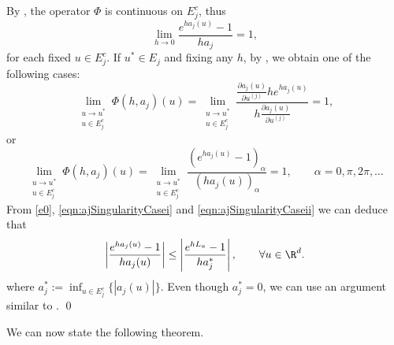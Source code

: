 \documentclass[sort&compress, preprint]{elsarticle}
\theoremstyle{definition}
\theoremstyle{plain}%
\theoremstyle{remark}
\begin{document}
\begin{pf}    By , the operator $\Phi$ is continuous
	on $E_j^c$, thus 
	\begin{equation}\label{e0}
		\lim_{h\to 0}
		\frac{e^{ha_j(u)}-1}{ha_j}=1,
	\end{equation}
	for each fixed $u\in E_j^c$. If $u^*\in E_j$ and fixing any $h$, by , 
	we obtain one of the following cases:
	\begin{equation}\label{eqn:ajSingularityCasei}
				\lim_{
					\substack{
						u \to u^*\\ 
						u\in E_j^c
					}
				}
				\Phi(h,a_j)(u) =
				\lim_{
					\substack{
						u \to u^*\\ 
						u\in E_j^c
					}
				}	
				\frac{\frac{\partial a_j(u)}{\partial u^{(j)}} 
					h e^{h a_j(u)} 
				}{
					h\frac{\partial a_j(u)}{\partial u^{(j)}}
				}=1,
			\end{equation}	
or
			\begin{equation}\label{eqn:ajSingularityCaseii}
			\lim_{
				\substack{
					u \to u^*\\ 
					u\in E_j^c
				}
			}
			\Phi(h,a_j)(u) 
			=
			\lim_{
				\substack{
					u \to u^*\\ 
					u\in E_j^c
				}
			}	
			\frac{
				\left(
					 e^{h a_j(u)} - 1
				 \right)_{\alpha}
			}{
				\left(
					h a_j(u)
				\right)_{\alpha}
			}	=	1, \qquad \alpha = 0,\pi, 2\pi,\dots
		\end{equation}	
	From \eqref{e0}, \eqref{eqn:ajSingularityCasei} and \eqref{eqn:ajSingularityCaseii} we can deduce that 	
	\begin{equation}\label{eqn:PhiBound}
		\left|\frac{e^{ha_j(u)}-1}{ha_j(u)}
		\right|\leq\left|\frac{e^{hL_a}-1}{ha^*_j}
		\right|,
		\qquad \forall u \in \R^d.
	\end{equation}
	where $a^*_j:= \inf_{u\in E_j^c}\{|a_j(u)|\}$. Even though $a^*_j=0$, we can
	use an argument similar to .	\qed	
\end{pf}

We can  now state the following theorem.
\end{document}
